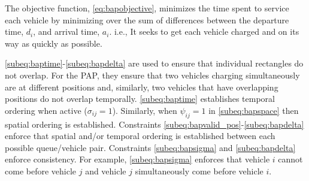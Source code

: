 \documentclass[ee,msthesis]{usuthesis}
\begin{document}
\noindent

The objective function, \autoref{eq:bapobjective}, minimizes the time spent to service each vehicle by minimizing over
the sum of differences between the departure time, \(d_i\), and arrival time, \(a_i\). i.e., It seeks to get each vehicle
charged and on its way as quickly as possible.

\autoref{subeq:baptime}-\autoref{subeq:bapdelta} are used to ensure that individual rectangles do not overlap. For the
PAP, they ensure that two vehicles charging simultaneously are at different positions and, similarly, two vehicles that
have overlapping positions do not overlap temporally. \autoref{subeq:baptime} establishes temporal ordering when active
(\(\sigma_{ij}=1\)). Similarly, when \(\psi_{ij} =1\) in \autoref{subeq:bapspace} then spatial ordering is established. Constraints
\autoref{subeq:bapvalid_pos}-\autoref{subeq:bapdelta} enforce that spatial and/or temporal ordering is established
between each possible queue/vehicle pair. Constraints \autoref{subeq:bapsigma} and \autoref{subeq:bapdelta} enforce
consistency. For example, \autoref{subeq:bapsigma} enforces that vehicle \(i\) cannot come before vehicle \(j\) and vehicle
\(j\) simultaneously come before vehicle \(i\).
\end{document}
